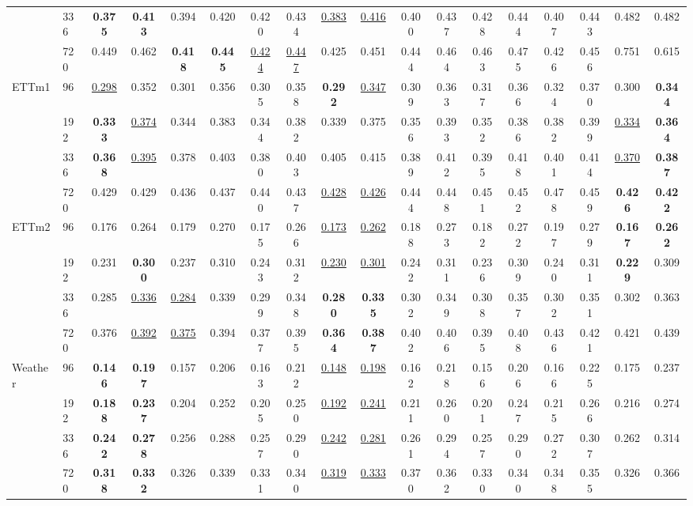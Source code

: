 \begin{table}[!t]
\begin{tabular*}{\textwidth}{@{\extracolsep{\fill}}ll*{16}{c}@{}}
 & 336 & \textbf{0.375} & \textbf{0.413} & 0.394 & 0.420 & 0.420 & 0.434 & \underline{0.383} & \underline{0.416} & 0.400 & 0.437 & 0.428 & 0.444 & 0.407 & 0.443 & 0.482 & 0.482 \\
 & 720 & 0.449 & 0.462 & \textbf{0.418} & \textbf{0.445} & \underline{0.424} & \underline{0.447} & 0.425 & 0.451 & 0.444 & 0.464 & 0.463 & 0.475 & 0.426 & 0.456 & 0.751 & 0.615 \\
ETTm1 & 96 & \underline{0.298} & 0.352 & 0.301 & 0.356 & 0.305 & 0.358 & \textbf{0.292} & \underline{0.347} & 0.309 & 0.363 & 0.317 & 0.366 & 0.324 & 0.370 & 0.300 & \textbf{0.344} \\
 & 192 & \textbf{0.333} & \underline{0.374} & 0.344 & 0.383 & 0.344 & 0.382 & 0.339 & 0.375 & 0.356 & 0.393 & 0.352 & 0.386 & 0.382 & 0.399 & \underline{0.334} & \textbf{0.364} \\
 & 336 & \textbf{0.368} & \underline{0.395} & 0.378 & 0.403 & 0.380 & 0.403 & 0.405 & 0.415 & 0.389 & 0.412 & 0.395 & 0.418 & 0.401 & 0.414 & \underline{0.370} & \textbf{0.387} \\
 & 720 & 0.429 & 0.429 & 0.436 & 0.437 & 0.440 & 0.437 & \underline{0.428} & \underline{0.426} & 0.444 & 0.448 & 0.451 & 0.452 & 0.478 & 0.459 & \textbf{0.426} & \textbf{0.422} \\
ETTm2 & 96 & 0.176 & 0.264 & 0.179 & 0.270 & 0.175 & 0.266 & \underline{0.173} & \underline{0.262} & 0.188 & 0.273 & 0.182 & 0.272 & 0.197 & 0.279 & \textbf{0.167} & \textbf{0.262} \\
 & 192 & 0.231 & \textbf{0.300} & 0.237 & 0.310 & 0.243 & 0.312 & \underline{0.230} & \underline{0.301} & 0.242 & 0.311 & 0.236 & 0.309 & 0.240 & 0.311 & \textbf{0.229} & 0.309 \\
 & 336 & 0.285 & \underline{0.336} & \underline{0.284} & 0.339 & 0.299 & 0.348 & \textbf{0.280} & \textbf{0.335} & 0.302 & 0.349 & 0.308 & 0.357 & 0.302 & 0.351 & 0.302 & 0.363 \\
 & 720 & 0.376 & \underline{0.392} & \underline{0.375} & 0.394 & 0.377 & 0.395 & \textbf{0.364} & \textbf{0.387} & 0.402 & 0.406 & 0.395 & 0.408 & 0.436 & 0.421 & 0.421 & 0.439 \\
Weather & 96 & \textbf{0.146} & \textbf{0.197} & 0.157 & 0.206 & 0.163 & 0.212 & \underline{0.148} & \underline{0.198} & 0.162 & 0.218 & 0.156 & 0.206 & 0.166 & 0.225 & 0.175 & 0.237 \\
 & 192 & \textbf{0.188} & \textbf{0.237} & 0.204 & 0.252 & 0.205 & 0.250 & \underline{0.192} & \underline{0.241} & 0.211 & 0.260 & 0.201 & 0.247 & 0.215 & 0.266 & 0.216 & 0.274 \\
 & 336 & \textbf{0.242} & \textbf{0.278} & 0.256 & 0.288 & 0.257 & 0.290 & \underline{0.242} & \underline{0.281} & 0.261 & 0.294 & 0.257 & 0.290 & 0.272 & 0.307 & 0.262 & 0.314 \\
 & 720 & \textbf{0.318} & \textbf{0.332} & 0.326 & 0.339 & 0.331 & 0.340 & \underline{0.319} & \underline{0.333} & 0.370 & 0.362 & 0.330 & 0.340 & 0.348 & 0.355 & 0.326 & 0.366 \\
\bottomrule
\end{tabular*}
\endgroup
\end{table}

